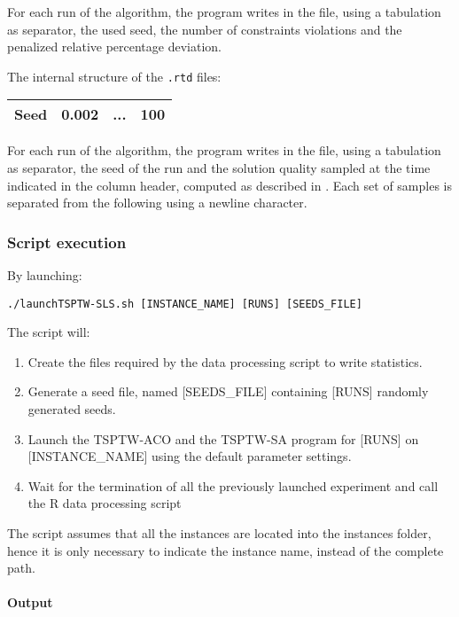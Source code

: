 \documentclass{article}
\begin{document}
For each run of the algorithm, the program writes in the file, using a tabulation as separator, the used seed, the number of constraints violations and the penalized relative percentage deviation.



The internal structure of the \verb|.rtd| files: 
\begin{tabular}{|c|c|c|c|}
\hline
\textbf{Seed}	&	\textbf{0.002} & \textbf{...} & \textbf{100}  \\ \hline
\end{tabular}

For each run of the algorithm, the program writes in the file, using a tabulation as separator, the seed of the run and the solution quality sampled at the time indicated in the column header, computed as described in .
Each set of samples is separated from the following using a newline character.


\subsubsection{Script execution}
By launching:
\begin{center}
\begin{verbatim}
./launchTSPTW-SLS.sh [INSTANCE_NAME] [RUNS] [SEEDS_FILE]
\end{verbatim}
\end{center}

The script will:
\begin{enumerate}
  \item Create the files required by the data processing script to write statistics.
  \item Generate a seed file, named [SEEDS\_FILE] containing [RUNS] randomly generated seeds.
  \item Launch the TSPTW-ACO and the TSPTW-SA program for [RUNS] on [INSTANCE\_NAME] using the default parameter settings.
  \item Wait for the termination of all the previously launched experiment and call the R data processing script
\end{enumerate}

The script assumes that all the instances are located into the instances folder, hence it is only necessary to indicate the instance name, instead of the complete path.

\paragraph{Output}
\end{document}
